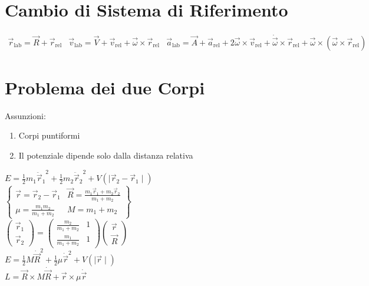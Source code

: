 \documentclass[a4paper,NoNotes,GeneralMath,12pt]{stdmdoc}
\begin{document}
	\section*{Cambio di Sistema di Riferimento}
	$\begin{array}{ccc} \vec{r}_{\text{lab}} = \vec{R} + \vec{r}_{\text{rel}} & \vec{v}_{\text{lab}} = \vec{V} + \vec{v}_{\text{rel}} + \vec{\omega} \times \vec{r}_{\text{rel}} & \vec{a}_{\text{lab}} = \vec{A} + \vec{a}_{\text{rel}} + 2 \vec{\omega} \times \vec{v}_{\text{rel}} + \dot{\vec{\omega}} \times \vec{r}_{\text{rel}} + \vec{\omega} \times \left( \vec{\omega} \times \vec{r}_{\text{rel}} \right) \end{array}$

	\section*{Problema dei due Corpi}
	Assunzioni:
	\begin{enumerate}
		\item Corpi puntiformi
		\item Il potenziale dipende solo dalla distanza relativa
	\end{enumerate}
	$E = \frac{1}{2} m_1 {\ddot{\vec{r}}_1}^2 + \frac{1}{2} m_2 {\ddot{\vec{r}}_2}^2 + V \left( \mid \vec{r}_2 - \vec{r}_1 \mid \right)$ \\ $\left\{ \begin{array}{cc} \vec{r} = \vec{r}_2 - \vec{r}_1 & \vec{R} = \frac{m_1 \vec{r}_1 + m_2 \vec{r}_2}{m_1 + m_2} \\ \mu = \frac{m_1 m_2}{m_1 + m_2} & M = m_1 + m_2 \end{array} \right\}$ \\ $\left( \begin{array}{c} \vec{r}_1 \\ \vec{r}_2 \end{array} \right) = \left( \begin{array}{cc} \frac{m_2}{m_1 + m_2} & 1 \\ \frac{m_1}{m_1 + m_2} & 1 \end{array} \right) \left( \begin{array}{c} \vec{r} \\ \vec{R} \end{array} \right)$ \\
	$E = \frac{1}{2} M {\dot{\vec{R}}}^2 + \frac{1}{2} \mu {\dot{\vec{r}}}^2 + V \left( \mid \vec{r} \mid \right)$ \\ $L = \vec{R} \times M \dot{\vec{R}} + \vec{r} \times \mu \dot{\vec{r}}$
\end{document}

